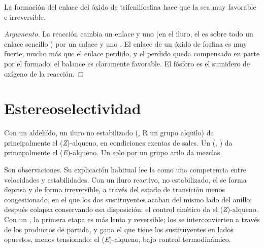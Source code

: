 \begin{proposition}\label{prop:b2:wittig:driving}
La formación del enlace  del óxido de trifenilfosfina hace que la  sea muy
favorable e irreversible.
\end{proposition}

\begin{proof}[Argumento]
La reacción cambia un enlace  y uno  (en el iluro, el  es sobre todo un enlace sencillo
) por un enlace  y uno . El enlace  de un óxido de fosfina es
muy fuerte, mucho más que el enlace  perdido, y el  perdido queda compensado en parte
por el  formado: el balance es claramente favorable. El fósforo es el sumidero de oxígeno de la
reacción.
\end{proof}

\section{Estereoselectividad}

\begin{proposition}\label{prop:b2:wittig:stereo}
Con un aldehído, un iluro no estabilizado (, R un grupo alquilo) da principalmente el (\textit{Z})-alqueno,
en condiciones exentas de sales. Un  (, ) da principalmente el
(\textit{E})-alqueno. Un  solo por un grupo arilo da mezclas.
\end{proposition}

\admitted

Son observaciones. Su explicación habitual lee la  como una competencia entre
velocidades y estabilidades. Con un iluro reactivo, no estabilizado, el  se forma deprisa y de forma
irreversible, a través del estado de transición menos congestionado, en el que los dos sustituyentes acaban del
mismo lado del anillo; después colapsa conservando esa disposición: el control cinético da el
(\textit{Z})-alqueno. Con un , la primera etapa es más lenta y reversible; los
 se interconvierten a través de los productos de partida, y gana el que tiene los sustituyentes en
lados opuestos, menos tensionado: el (\textit{E})-alqueno, bajo control termodinámico.

